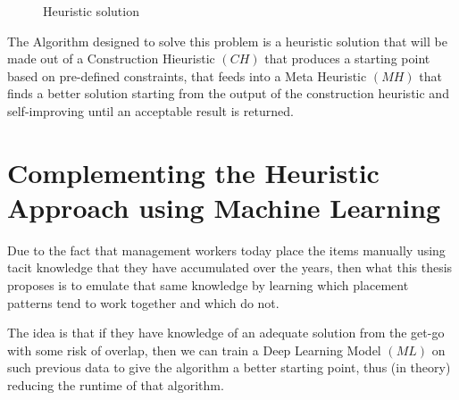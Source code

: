 \documentclass[12pt,a4paper]{report}
\begin{document}
\begin{figure}[ht]
    \centering

    \caption{Heuristic solution}
    \label{fig:solution}
\end{figure}

The Algorithm designed to solve this problem is a heuristic solution that will be made out of a Construction Hieuristic $(C\!H)$ that produces a starting point based on pre-defined constraints, that feeds into a Meta Heuristic $(M\!H)$ that finds a better solution starting from the output of the construction heuristic and self-improving until an acceptable result is returned. 


\section{Complementing the Heuristic Approach using Machine Learning}
Due to the fact that management workers today place the items manually using tacit knowledge that they have accumulated over the years, then what this thesis proposes is to emulate that same knowledge by learning which placement patterns tend to work together and which do not.

The idea is that if they have knowledge of an adequate solution from the get-go with some risk of overlap, then we can train a Deep Learning Model $(M\!L)$ on such previous data to give the algorithm a better starting point, thus (in theory) reducing the runtime of that algorithm.
\end{document}
